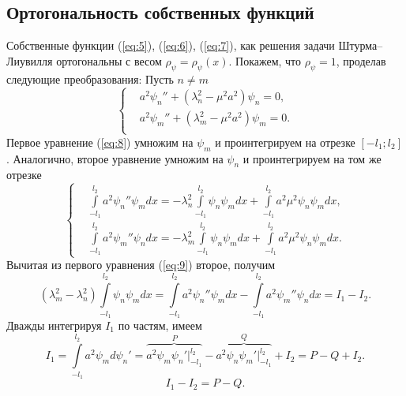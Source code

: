 \documentclass[12pt, a4paper]{article}
\begin{document}
\subsection{Ортогональность собственных функций}
Собственные функции (\ref{eq:5}), (\ref{eq:6}), (\ref{eq:7}), как решения задачи Штурма--Лиувилля ортогональны с весом $\rho_\psi=\rho_\psi(x)$. Покажем, что $\rho_\psi=1$, проделав следующие преобразования:
Пусть $n \ne m$
\begin{equation}
  \left\{  
    \begin{aligned}
      & a^2 \psi_n'' + (\lambda_n^2 - \mu^2 a^2) \psi_n = 0, \\
      & a^2 \psi_m'' + (\lambda_m^2 - \mu^2 a^2) \psi_m = 0. \\
    \end{aligned}
  \right.
  \label{eq:8}
\end{equation}
Первое уравнение (\ref{eq:8}) умножим на $\psi_m$ и проинтегрируем на отрезке $[-l_1; l_2]$. Аналогично, второе уравнение умножим на $\psi_n$ и проинтегрируем на том же отрезке
\begin{equation}
  \left\{  
    \begin{aligned}
      & \int \limits^{l_2}_{-l_1} a^2 \psi_n'' \psi_m dx = - \lambda_n^2 \int \limits^{l_2}_{-l_1} \psi_n \psi_m dx + \int \limits^{l_2}_{-l_1} a^2 \mu^2 \psi_n \psi_m dx, \\
      & \int \limits^{l_2}_{-l_1} a^2 \psi_m'' \psi_n dx = - \lambda_m^2 \int \limits^{l_2}_{-l_1} \psi_n \psi_m dx + \int \limits^{l_2}_{-l_1} a^2 \mu^2 \psi_n \psi_m dx. 
    \end{aligned}
  \right.
  \label{eq:9}
\end{equation}
Вычитая из первого уравнения (\ref{eq:9}) второе, получим 
\begin{equation}
  (\lambda_m^2 - \lambda_n^2) \int \limits^{l_2}_{-l_1} \psi_n \psi_m dx =  \int \limits^{l_2}_{-l_1} a^2 \psi_n'' \psi_m dx -  \int \limits^{l_2}_{-l_1} a^2 \psi_m'' \psi_n dx = I_1 - I_2.
  \label{eq:11}
\end{equation}
Дважды интегрируя $I_1$ по частям, имеем
\begin{equation}
  I_1 =  \int \limits^{l_2}_{-l_1} a^2 \psi_m d \psi_n' = \overbrace{a^2 \psi_m \psi_n' \Big|^{l_2}_{-l_1}}^P - \overbrace{a^2 \psi_n \psi_m' \Big|^{l_2}_{-l_1}}^Q + I_2 = P - Q + I_2.
\end{equation}
\begin{equation}
  I_1 - I_2 = P - Q.
  \label{eq:10}
\end{equation}
\end{document}
